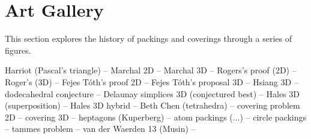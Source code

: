 \section{Art Gallery}

This section explores the history of  packings and coverings through a series of figures.

Harriot (Pascal's triangle) -- 
Marchal 2D -- Marchal 3D --  Rogers's proof (2D) -- Roger's (3D) -- Fejes T\'oth's proof 2D --
Fejes T\'oth's proposal 3D -- Hsiang 3D -- dodecahedral conjecture --
Delaunay simplices 3D (conjectured best) -- Hales 3D (superposition) --
Hales 3D hybrid -- Beth Chen (tetrahedra) -- covering problem 2D --
covering 3D -- heptagons (Kuperberg) -- atom packings (...) -- circle packings --
tammes problem --
van der Waerden 13 (Musin) -- 



\clearpage






